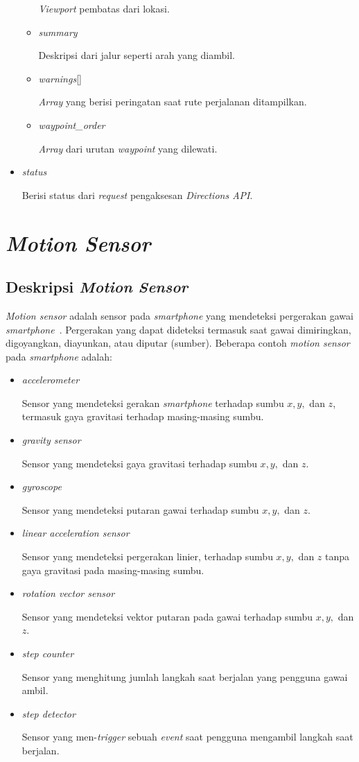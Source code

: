 \begin{itemize}
\begin{itemize}
		\textit{Viewport} pembatas dari lokasi.
		\item \textit{summary}
		
		Deskripsi dari jalur seperti arah yang diambil. 
		\item \textit{warnings}[]
		
		\textit{Array} yang berisi peringatan saat rute perjalanan ditampilkan. 
		\item \textit{waypoint\_order}
		
		\textit{Array} dari urutan \textit{waypoint} yang dilewati.
	\end{itemize}
	\item \textit{status}
	
	Berisi status dari \textit{request} pengaksesan \textit{Directions API}.
\end{itemize}

\section{\textit{Motion Sensor}}
\label{subs:motion-sensor}

\subsection{Deskripsi \textit{Motion Sensor}}
\textit{Motion sensor} adalah sensor pada \textit{smartphone} yang mendeteksi pergerakan gawai \textit{smartphone}~\cite{motion-sensor}. Pergerakan yang dapat dideteksi termasuk saat gawai dimiringkan, digoyangkan, diayunkan, atau diputar (sumber). Beberapa contoh \textit{motion sensor} pada \textit{smartphone} adalah:
\begin{itemize}
	\item \textit{accelerometer}
	
	Sensor yang mendeteksi gerakan \textit{smartphone} terhadap sumbu $x, y,$ dan $z$, termasuk gaya gravitasi terhadap masing-masing sumbu.
	\item \textit{gravity sensor}
	
	Sensor yang mendeteksi gaya gravitasi terhadap sumbu $x, y,$ dan $z$.
	\item \textit{gyroscope}
	
	Sensor yang mendeteksi putaran gawai terhadap sumbu $x, y,$ dan $z$.
	\item \textit{linear acceleration sensor}
	
	Sensor yang mendeteksi pergerakan linier, terhadap sumbu $x, y,$ dan $z$ tanpa gaya gravitasi pada masing-masing sumbu.
	\item \textit{rotation vector sensor}
	
	Sensor yang mendeteksi vektor putaran pada gawai terhadap sumbu $x, y,$ dan $z$.
	
	\item \textit{step counter}
	
	Sensor yang menghitung jumlah langkah saat berjalan yang pengguna gawai ambil.
	\item \textit{step detector}
	
	Sensor yang men-\textit{trigger} sebuah \textit{event} saat pengguna mengambil langkah saat berjalan.
\end{itemize}


